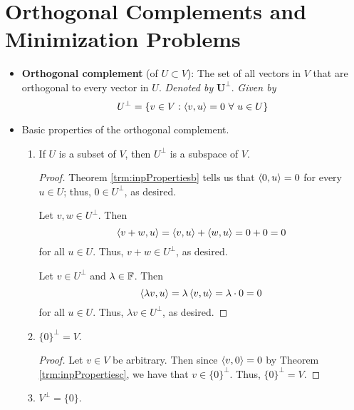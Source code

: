 \documentclass[../main.tex]{subfiles}
\begin{document}
\section{Orthogonal Complements and Minimization Problems}
\begin{itemize}
    \item \textbf{Orthogonal complement} (of $U\subset V$): The set of all vectors in $V$ that are orthogonal to every vector in $U$. \emph{Denoted by} $\bm{U^\perp}$. \emph{Given by}
    \begin{equation*}
        U^\perp = \{v\in V:\left\langle{v},{u}\right\rangle=0\ \forall\ u\in U\}
    \end{equation*}
    \item Basic properties of the orthogonal complement.
    \begin{theorem}\label{trm:perpProperties}\leavevmode
        \begin{enumerate}[label={\textup{(}\alph*\textup{)}},ref={\thetheorem\alph*}]
            \item \label{trm:perpPropertiesa}If $U$ is a subset of $V$, then $U^\perp$ is a subspace of $V$.
            \begin{proof}
                Theorem \ref{trm:inpPropertiesb} tells us that $\left\langle{0},{u}\right\rangle=0$ for every $u\in U$; thus, $0\in U^\perp$, as desired.\par
                Let $v,w\in U^\perp$. Then
                \begin{equation*}
                    \left\langle{v+w},{u}\right\rangle = \left\langle{v},{u}\right\rangle+\left\langle{w},{u}\right\rangle = 0+0 = 0
                \end{equation*}
                for all $u\in U$. Thus, $v+w\in U^\perp$, as desired.\par
                Let $v\in U^\perp$ and $\lambda\in\mathbb{F}$. Then
                \begin{equation*}
                    \left\langle{\lambda v},{u}\right\rangle = \lambda\left\langle{v},{u}\right\rangle = \lambda\cdot 0 = 0
                \end{equation*}
                for all $u\in U$. Thus, $\lambda v\in U^\perp$, as desired.
            \end{proof}
            \item \label{trm:perpPropertiesb}$\{0\}^\perp=V$.
            \begin{proof}
                Let $v\in V$ be arbitrary. Then since $\left\langle{v},{0}\right\rangle=0$ by Theorem \ref{trm:inpPropertiesc}, we have that $v\in\{0\}^\perp$. Thus, $\{0\}^\perp=V$.
            \end{proof}
            \item \label{trm:perpPropertiesc}$V^\perp=\{0\}$.

\end{enumerate}
\end{theorem}
\end{itemize}
\end{document}
